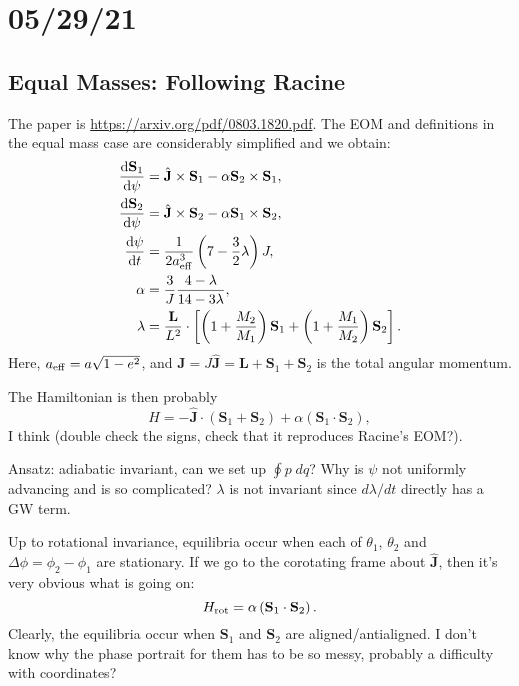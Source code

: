 \documentclass[11pt,
        usenames, %
        dvipsnames %
    ]{article}
\newcommand*{\rd}[2]{\frac{\mathrm{d}#1}{\mathrm{d}#2}}
\newcommand*{\bm}[1]{\boldsymbol{\mathbf{#1}}}
\newcommand*{\uv}[1]{\hat{\bm{#1}}}
\newcommand*{\p}[1]{\left(#1\right)}
\newcommand*{\s}[1]{\left[#1\right]}
\begin{document}
\section{05/29/21}

\subsection{Equal Masses: Following Racine}

The paper is \url{https://arxiv.org/pdf/0803.1820.pdf}. The EOM and definitions
in the equal mass case are considerably simplified and we obtain:
\begin{align}
    \rd{\bm{S}_1}{\psi} &= \uv{J} \times \bm{S}_1
        - \alpha \bm{S}_2 \times \bm{S}_1,\\
    \rd{\bm{S}_2}{\psi} &= \uv{J} \times \bm{S}_2
        - \alpha \bm{S}_1 \times \bm{S}_2,\\
    \rd{\psi}{t} &= \frac{1}{2a_{\rm eff}^3}\p{7 - \frac{3}{2}\lambda}J,\\
    \alpha &= \frac{3}{J}\frac{4 - \lambda}{14 - 3\lambda},\\
    \lambda &= \frac{\bm{L}}{L^2} \cdot
        \s{\p{1 + \frac{M_2}{M_1}}\bm{S}_1
            + \p{1 + \frac{M_1}{M_2}}\bm{S}_2}.
\end{align}
Here, $a_{\rm eff} = a\sqrt{1 - e^2}$, and $\bm{J} = J\uv{J} = \bm{L} + \bm{S}_1
+ \bm{S}_2$ is the total angular momentum.

The Hamiltonian is then probably
\begin{equation}
    H = -\uv{J} \cdot \p{\bm{S}_1 + \bm{S}_2}
        + \alpha\p{\bm{S}_1 \cdot \bm{S}_2},
\end{equation}
I think (double check the signs, check that it reproduces Racine's EOM?).

Ansatz: adiabatic invariant, can we set up $\oint p\;dq$? Why is $\psi$ not
uniformly advancing and is so complicated? $\lambda$ is not invariant since
$d\lambda/dt$ directly has a GW term.

Up to rotational invariance, equilibria occur when each of $\theta_1$,
$\theta_2$ and $\Delta \phi = \phi_2 - \phi_1$ are stationary. If we go to the
corotating frame about $\uv{J}$, then it's very obvious what is going on:
\begin{equation}
    H_{\rm rot} = \alpha \p{\bm{S}_1 \cdot \bm{S}_2}.
\end{equation}
Clearly, the equilibria occur when $\bm{S}_1$ and $\bm{S}_2$ are
aligned/antialigned. I don't know why the phase portrait for them has to be so
messy, probably a difficulty with coordinates?
\end{document}
